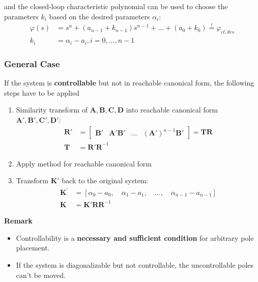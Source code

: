 and the closed-loop characteristic polynomial can be used to choose the parameters $k_i$ based on the desired parameters $\alpha_i$:
\noindent\begin{align*}
    \varphi(s) & =s^n+(a_{n-1}+k_{n-1})s^{n-1}+\ldots+(a_0+k_0) \overset{!}{=} \varphi_{cl,des} \\
    k_i        & =\alpha_i-a_i,i=0,\ldots,n-1
\end{align*}

\subsubsection{General Case}
If the system is \textbf{controllable} but not in reachable canonical form, the following steps have to be applied
\begin{enumerate}
    \item Similarity transform of $\mathbf{A,B,C,D}$ into reachable canonical form $\mathbf{A',B',C',D'}$:
          \noindent\begin{align*}
              \mathbf{R}' & =\begin{bmatrix}
                                 \mathbf{B}' & \mathbf{A}'\mathbf{B}' & \ldots & {(\mathbf{A}')}^{n-1}\mathbf{B}'
                             \end{bmatrix}
              =\mathbf{TR}                                                                                                \\
              \mathbf{T}  & = \mathbf{R'R}^{-1}
          \end{align*}
    \item Apply method for reachable canonical form
    \item Transform $\mathbf{K}'$ back to the original system:
          \noindent\begin{align*}
              \mathbf{K}^{\prime} & =\left[\alpha_{0}-a_{0},\quad\alpha_{1}-a_{1},\quad\ldots,\quad\alpha_{n-1}-a_{n-1}\right] \\
              \mathbf{K}          & = \mathbf{K'RR}^{-1}
          \end{align*}
\end{enumerate}
\textbf{Remark}
\begin{itemize}
    \item Controllability is a \textbf{necessary and sufficient condition} for arbitrary pole placement. 
    \item If the system is diagonalizable but not controllable, the uncontrollable poles can't be moved.
\end{itemize}

